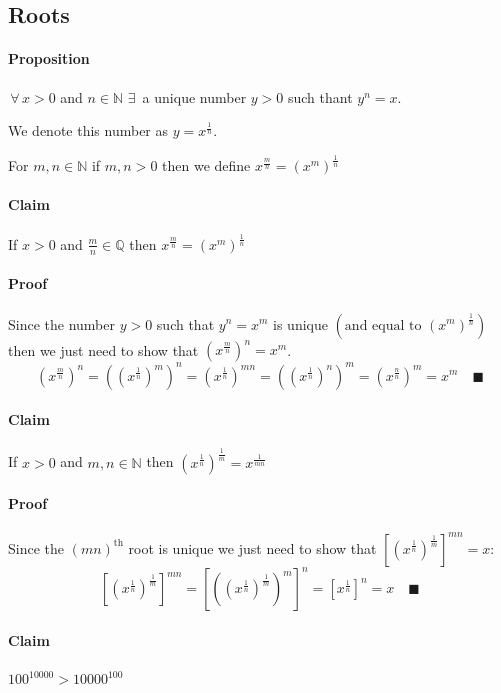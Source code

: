\documentclass{article}
\newcommand{\bb}[1]{\mathbb{#1}}
\newcommand{\A}{\,\forall\,}
\newcommand{\E}{\,\exists\,}
\begin{document}
\subsection*{Roots}

\paragraph{Proposition} \(\A x>0\) and \(n\in\bb N\,\E\) a unique number \(y>0\) such thant \(y^n=x\).

We denote this number as \(y=x^{\frac 1n}\).

For \(m,n\in\bb N\) if \(m,n>0\) then we define \(x^{\frac mn}=(x^m)^{\frac 1n}\)

\paragraph{Claim} If \(x>0\) and \(\frac mn\in\bb Q\) then \(x^{\frac mn}=(x^m)^{\frac 1n}\)

\paragraph{Proof} Since the number \(y>0\) such that \(y^n=x^m\) is unique \(\left(\text{and equal to } (x^m)^{\frac 1n}\right)\) then we just need to show that \(\left(x^{\frac mn}\right)^n=x^m\).
\[\left(x^{\frac mn}\right)^n=\left(\left(x^{\frac 1n}\right)^m\right)^n=\left(x^{\frac 1n}\right)^{mn}=\left(\left(x^{\frac 1n}\right)^n\right)^m=\left(x^{\frac nn}\right)^m=x^m\quad\blacksquare\]

\paragraph{Claim} If \(x>0\) and \(m,n\in\bb N\) then \(\left(x^{\frac 1n}\right)^{\frac 1m}=x^{\frac{1}{mn}}\)

\paragraph{Proof} Since the \((mn)^{\text{th}}\) root is unique we just need to show that \(\left[\left(x^{\frac 1n}\right)^{\frac 1m}\right]^{mn}=x\):
\[\left[\left(x^{\frac 1n}\right)^{\frac 1m}\right]^{mn}=\left[\left(\left(x^{\frac 1n}\right)^{\frac 1m}\right)^m\right]^n=\left[x^{\frac 1n}\right]^n=x\quad\blacksquare\]

\paragraph{Claim} \(100^{10000}>10000^{100}\)
\end{document}
